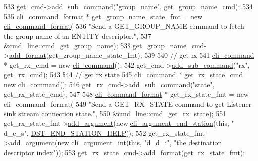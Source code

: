 \begin{DoxyCode}
533     get\_cmd->\hyperlink{classcli__command_aa73a67e8ebb6facd4b40ced66279b226}{add\_sub\_command}(\textcolor{stringliteral}{"group\_name"}, get\_group\_name\_cmd);
534 
535     \hyperlink{classcli__command__format}{cli\_command\_format} * get\_group\_name\_state\_fmt = \textcolor{keyword}{new} 
      \hyperlink{classcli__command__format}{cli\_command\_format}(
536         \textcolor{stringliteral}{"Send a GET\_GROUP\_NAME command to fetch the group name of an ENTITY descriptor."},
537         &\hyperlink{classcmd__line_a56481509c218ebbd521cd60a0aab31fb}{cmd\_line::cmd\_get\_group\_name});
538     get\_group\_name\_cmd->\hyperlink{classcli__command_aa9ec38e761644d946f8db2b920e39921}{add\_format}(get\_group\_name\_state\_fmt);
539 
540     \textcolor{comment}{// get rx}
541     \hyperlink{classcli__command}{cli\_command} * get\_rx\_cmd = \textcolor{keyword}{new} \hyperlink{classcli__command}{cli\_command}();
542     get\_cmd->\hyperlink{classcli__command_aa73a67e8ebb6facd4b40ced66279b226}{add\_sub\_command}(\textcolor{stringliteral}{"rx"}, get\_rx\_cmd);
543 
544     \textcolor{comment}{// get rx state}
545     \hyperlink{classcli__command}{cli\_command} * get\_rx\_state\_cmd = \textcolor{keyword}{new} \hyperlink{classcli__command}{cli\_command}();
546     get\_rx\_cmd->\hyperlink{classcli__command_aa73a67e8ebb6facd4b40ced66279b226}{add\_sub\_command}(\textcolor{stringliteral}{"state"}, get\_rx\_state\_cmd);
547 
548     \hyperlink{classcli__command__format}{cli\_command\_format} * get\_rx\_state\_fmt = \textcolor{keyword}{new} 
      \hyperlink{classcli__command__format}{cli\_command\_format}(
549         \textcolor{stringliteral}{"Send a GET\_RX\_STATE command to get Listener sink stream connection state."},
550         &\hyperlink{classcmd__line_a68e20645ab1852e7cf7898896e0359ad}{cmd\_line::cmd\_get\_rx\_state});
551     get\_rx\_state\_fmt->\hyperlink{classcli__command__format_ac3fc6d13a227c195d5ee6f7b78eba9cd}{add\_argument}(\textcolor{keyword}{new} \hyperlink{classcli__argument__end__station}{cli\_argument\_end\_station}(\textcolor{keyword}{this}, \textcolor{stringliteral}{"
      d\_e\_s"}, \hyperlink{cmd__line_8cpp_a98040c43d21908ec69faa420184085bd}{DST\_END\_STATION\_HELP}));
552     get\_rx\_state\_fmt->\hyperlink{classcli__command__format_ac3fc6d13a227c195d5ee6f7b78eba9cd}{add\_argument}(\textcolor{keyword}{new} \hyperlink{classcli__argument__int}{cli\_argument\_int}(\textcolor{keyword}{this}, \textcolor{stringliteral}{"d\_d\_i"}, \textcolor{stringliteral}{"the
       destination descriptor index"}));
553     get\_rx\_state\_cmd->\hyperlink{classcli__command_aa9ec38e761644d946f8db2b920e39921}{add\_format}(get\_rx\_state\_fmt);

\end{DoxyCode}
